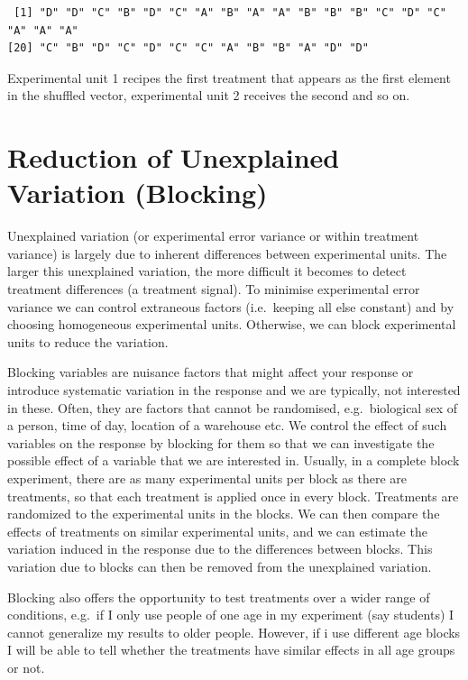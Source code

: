 \documentclass[
  letterpaper,
]{book}
\begin{document}
\begin{verbatim}
 [1] "D" "D" "C" "B" "D" "C" "A" "B" "A" "A" "B" "B" "B" "C" "D" "C" "A" "A" "A"
[20] "C" "B" "D" "C" "D" "C" "C" "A" "B" "B" "A" "D" "D"
\end{verbatim}

Experimental unit 1 recipes the first treatment that appears as the
first element in the shuffled vector, experimental unit 2 receives the
second and so on.

\section*{Reduction of Unexplained Variation
(Blocking)}\label{reduction-of-unexplained-variation-blocking}


Unexplained variation (or experimental error variance or within
treatment variance) is largely due to inherent differences between
experimental units. The larger this unexplained variation, the more
difficult it becomes to detect treatment differences (a treatment
signal). To minimise experimental error variance we can control
extraneous factors (i.e.~keeping all else constant) and by choosing
homogeneous experimental units. Otherwise, we can block experimental
units to reduce the variation.

Blocking variables are nuisance factors that might affect your response
or introduce systematic variation in the response and we are typically,
not interested in these. Often, they are factors that cannot be
randomised, e.g.~biological sex of a person, time of day, location of a
warehouse etc. We control the effect of such variables on the response
by blocking for them so that we can investigate the possible effect of a
variable that we are interested in. Usually, in a complete block
experiment, there are as many experimental units per block as there are
treatments, so that each treatment is applied once in every block.
Treatments are randomized to the experimental units in the blocks. We
can then compare the effects of treatments on similar experimental
units, and we can estimate the variation induced in the response due to
the differences between blocks. This variation due to blocks can then be
removed from the unexplained variation.

Blocking also offers the opportunity to test treatments over a wider
range of conditions, e.g.~if I only use people of one age in my
experiment (say students) I cannot generalize my results to older
people. However, if i use different age blocks I will be able to tell
whether the treatments have similar effects in all age groups or not.
\end{document}
